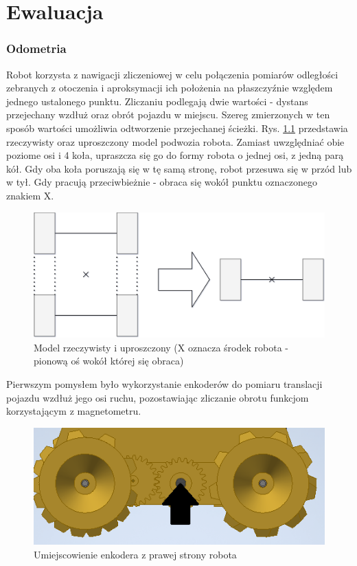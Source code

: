 \chapter{Ewaluacja}

\subsection{Odometria}
\label{sec:odometry}
Robot korzysta z nawigacji zliczeniowej w celu połączenia pomiarów odległości zebranych z otoczenia i aproksymacji ich położenia na płaszczyźnie względem jednego ustalonego punktu. Zliczaniu podlegają dwie wartości - dystans przejechany wzdłuż oraz obrót pojazdu w miejscu. Szereg zmierzonych w ten sposób wartości umożliwia odtworzenie przejechanej ścieżki. Rys. \ref{fig:odom-axis-simplified} przedstawia rzeczywisty oraz uproszczony model podwozia robota. Zamiast uwzględniać obie poziome osi i 4 koła, upraszcza się go do formy robota o jednej osi, z jedną parą kół. Gdy oba koła poruszają się w tę samą stronę, robot przesuwa się w przód lub w tył. Gdy pracują przeciwbieżnie - obraca się wokół punktu oznaczonego znakiem X.

\begin{figure}[H]
	\centering
		\includegraphics[width=0.6\linewidth]{rys/robot-odometry-simplified.pdf}
	\caption{Model rzeczywisty i uproszczony (X oznacza środek robota - pionową oś wokół której się obraca)}
	\label{fig:odom-axis-simplified}
\end{figure}


Pierwszym pomysłem było wykorzystanie enkoderów do pomiaru translacji pojazdu wzdłuż jego osi ruchu, pozostawiając zliczanie obrotu funkcjom korzystającym z magnetometru.

\begin{figure}[H]
	\centering
		\includegraphics[width=0.5\linewidth]{rys/encoder-position.png}
	\caption{Umiejscowienie enkodera z prawej strony robota}
	\label{fig:encoder-pos}
\end{figure}

